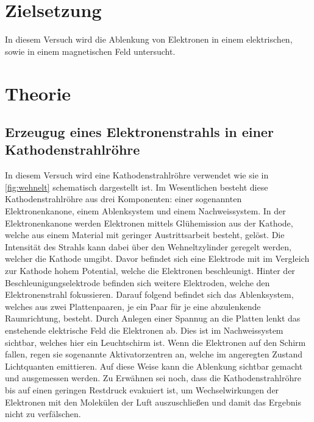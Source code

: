 \section{Zielsetzung}
    In diesem Versuch wird die Ablenkung von Elektronen in einem elektrischen, sowie in einem magnetischen Feld untersucht.

\section{Theorie}
\label{sec:Theorie}
    \subsection{Erzeugug eines Elektronenstrahls in einer Kathodenstrahlröhre}
    In diesem Versuch wird eine Kathodenstrahlröhre verwendet wie sie in \autoref{fig:wehnelt} schematisch dargestellt ist.
    Im Wesentlichen besteht diese Kathodenstrahlröhre aus drei Komponenten: einer sogenannten Elektronenkanone, einem Ablenksystem und einem 
    Nachweissystem. In der Elektronenkanone werden Elektronen mittels Glühemission aus der Kathode, welche aus einem Material mit 
    geringer Austrittsarbeit besteht, gelöst. Die Intensität des Strahls kann dabei über den Wehneltzylinder geregelt werden, welcher die
    Kathode umgibt. Davor befindet sich eine Elektrode mit im Vergleich zur Kathode hohem Potential, welche die Elektronen beschleunigt.
    Hinter der Beschleunigungselektrode befinden sich weitere Elektroden, welche den Elektronenstrahl fokussieren. Darauf folgend befindet sich das 
    Ablenksystem, welches aus zwei Plattenpaaren, je ein Paar für je eine abzulenkende Raumrichtung, besteht. Durch Anlegen einer Spannug an die
    Platten lenkt das enstehende elektrische Feld die Elektronen ab. Dies ist im Nachweissystem sichtbar, welches hier ein Leuchtschirm ist.
    Wenn die Elektronen auf den Schirm fallen, regen sie sogenannte Aktivatorzentren an, welche im angeregten Zustand Lichtquanten emittieren.
    Auf diese Weise kann die Ablenkung sichtbar gemacht und ausgemessen werden.
    Zu Erwähnen sei noch, dass die Kathodenstrahlröhre bis auf einen geringen Restdruck evakuiert ist, um Wechselwirkungen der Elektronen mit 
    den Molekülen der Luft auszuschließen und damit das Ergebnis nicht zu verfälschen.
